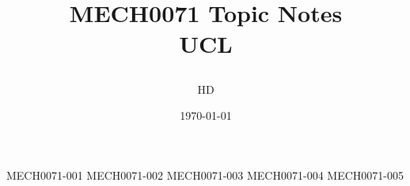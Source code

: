 \documentclass[12pt,a4paper, twoside]{report}
\begin{document}
\title{
{MECH0071 Topic Notes}\\
{\large UCL}
\author{HD}
\date{\today}
}
\maketitle
\tableofcontents
{MECH0071-001}
{MECH0071-002}
{MECH0071-003}
{MECH0071-004}
{MECH0071-005}
\end{document}
